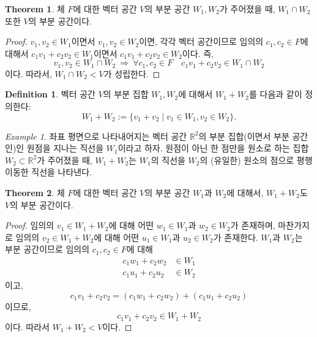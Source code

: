 \documentclass[unfonts,oneside,a4paper]{oblivoir}
\theoremstyle{definition}
\newtheorem{definition}{Definition}
\theoremstyle{theorem}
\newtheorem{theorem}{Theorem}
\theoremstyle{remark}
\theoremstyle{remark}
\theoremstyle{remark}
\newtheorem*{example}{Example}
\theoremstyle{remark}
\renewcommand{\vec}[1]{\bm{\mathit{#1}}}
\begin{document}
\begin{theorem}
    체 $F$에 대한 벡터 공간 $V$의 부분 공간 $W_1, W_2$가 주어졌을 때, $W_1 \cap W_2$ 또한 $V$의 부분 공간이다.
\end{theorem}

\begin{proof}
    $\vec v_1, \vec v_2 \in W_1$이면서 $\vec v_1, \vec v_2 \in W_2$이면, 각각 벡터 공간이므로 임의의 $c_1, c_2 \in F$에 대해서 $c_1 \vec v_1 + c_2 \vec v_2 \in W_1$이면서 $c_1 \vec v_1 + c_2 \vec v_2 \in W_2$이다.
    즉,
    \[
        \vec v_1, \vec v_2 \in W_1 \cap W_2\ \Rightarrow\ \forall c_1, c_2 \in F \quad c_1 \vec v_1 + c_2 \vec v_2 \in W_1 \cap W_2
    \]
    이다.
    따라서, $W_1 \cap W_2 < V$가 성립한다.
\end{proof}

\begin{definition}
    벡터 공간 $V$의 부분 집합 $W_1, W_2$에 대해서 $W_1 + W_2$를 다음과 같이 정의한다:
    \[
        W_1 + W_2 := \{\vec v_1 + \vec v_2 \mid \vec v_1 \in W_1, \vec v_2 \in W_2\}.
    \]
\end{definition}

\begin{example}
    좌표 평면으로 나타내어지는 벡터 공간 $\mathbb R^2$의 부분 집합(이면서 부분 공간인)인 원점을 지나는 직선을 $W_1$이라고 하자.
    원점이 아닌 한 점만을 원소로 하는 집합 $W_2 \subset \mathbb R^2$가 주어졌을 때, $W_1 + W_2$는 $W_1$의 직선을 $W_2$의 (유일한) 원소의 점으로 평행 이동한 직선을 나타낸다.
\end{example}

\begin{theorem}
    체 $F$에 대한 벡터 공간 $V$의 부분 공간 $W_1$과 $W_2$에 대해서, $W_1 + W_2$도 $V$의 부분 공간이다.
\end{theorem}

\begin{proof}
    임의의 $\vec v_1 \in W_1 + W_2$에 대해 어떤 $\vec w_1 \in W_1$과 $\vec w_2 \in W_2$가 존재하며, 마찬가지로 임의의 $\vec v_2 \in W_1 + W_2$에 대해 어떤 $\vec u_1 \in W_1$과 $\vec u_2 \in W_2$가 존재한다.
    $W_1$과 $W_2$는 부분 공간이므로 임의의 $c_1, c_2 \in F$에 대해
    \begin{align*}
        c_1 \vec w_1 + c_2 \vec w_2 &\in W_1\\
        c_1 \vec u_1 + c_2 \vec u_2 &\in W_2
    \end{align*}
    이고,
    \begin{equation*}
        c_1 \vec v_1 + c_2 \vec v_2 = (c_1 \vec w_1 + c_2 \vec w_2) + (c_1 \vec u_1 + c_2 \vec u_2)
    \end{equation*}
    이므로,
    \begin{equation*}
        c_1 \vec v_1 + c_2 \vec v_2 \in W_1 + W_2
    \end{equation*}
    이다.
    따라서 $W_1 + W_2 < V$이다.
\end{proof}
\end{document}
